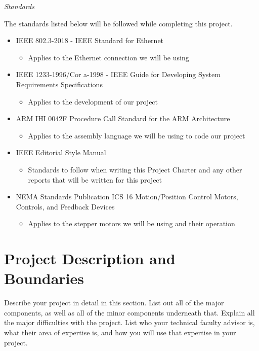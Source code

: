 \textit{Standards} \par
\vspace{2pt}
\setlength{\parindent}{2.5ex} The standards listed below will be followed while completing this project.
\begin{itemize}
	\item IEEE 802.3-2018 - IEEE Standard for Ethernet 
	\begin{itemize}
		\item Applies to the Ethernet connection we will be using
	\end{itemize}
	\item IEEE 1233-1996/Cor a-1998 - IEEE Guide for Developing System Requirements Specifications
	\begin{itemize}
		\item Applies to the development of our project
	\end{itemize}	
	\item ARM IHI 0042F Procedure Call Standard for the ARM Architecture
	\begin{itemize}
		\item Applies to the assembly language we will be using to code our project
	\end{itemize}
	\item IEEE Editorial Style Manual
	\begin{itemize}
		\item Standards to follow when writing this Project Charter and any other reports that will be written for this project
	\end{itemize}
	\item NEMA Standards Publication ICS 16 Motion/Position Control Motors, Controls, and Feedback Devices
	\begin{itemize}
		\item Applies to the stepper motors we will be using and their operation
	\end{itemize}
\end{itemize}
 
\section{Project Description and Boundaries}
Describe your project in detail in this section.  List out all of the major components, as well as all of the minor components underneath that.
Explain all the major difficulties with the project.  
List who your technical faculty advisor is, what their area of expertise is, and how
you will use that expertise in your project.

